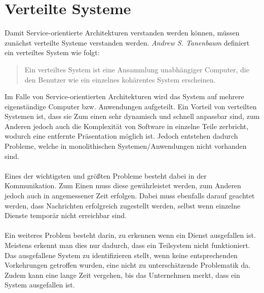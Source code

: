 \section{Verteilte Systeme}
\label{sec:VerteilteAnwendungen}
Damit Service-orientierte Architekturen verstanden werden können, müssen zunächst verteilte Systeme verstanden werden. \textit{Andrew S. Tanenbaum} definiert ein verteiltes System wie folgt:
\begin{quotation}
    \frqq Ein verteiltes System ist eine Ansammlung unabhängiger Computer, die den Benutzer wie ein einzelnes kohärentes System erscheinen.\flqq\cite[S. 19]{tanenbaum:VerteilteSysteme}
\end{quotation}
Im Falle von Service-orientierten Architekturen wird das System auf mehrere eigenständige Computer bzw. Anwendungen aufgeteilt. Ein Vorteil von verteilten Systemen ist, dass sie Zum einen sehr dynamisch und schnell anpassbar sind, zum Anderen jedoch auch die Komplexität von Software in einzelne Teile zerbricht, wodurch eine entfernte Präsentation möglich ist.
Jedoch entstehen dadurch Probleme, welche in monolithischen Systemen/Anwendungen nicht vorhanden sind.
\\\\
Eines der wichtigsten und größten Probleme besteht dabei in der Kommunikation. Zum Einen muss diese gewährleistet werden, zum Anderen jedoch auch in angemessener Zeit erfolgen. Dabei muss ebenfalls darauf geachtet werden, dass Nachrichten erfolgreich zugestellt werden, selbst wenn einzelne Dienste temporär nicht erreichbar sind.
\\\\
Ein weiteres Problem besteht darin, zu erkennen wenn ein Dienst ausgefallen ist. Meistens erkennt man dies nur dadurch, dass ein Teilsystem nicht funktioniert. Das ausgefallene System zu identifizieren stellt, wenn keine entsprechenden Vorkehrungen getroffen wurden, eine nicht zu unterschätzende Problematik da. Zudem kann eine lange Zeit vergehen, bis das Unternehmen merkt, dass ein System ausgefallen ist.

